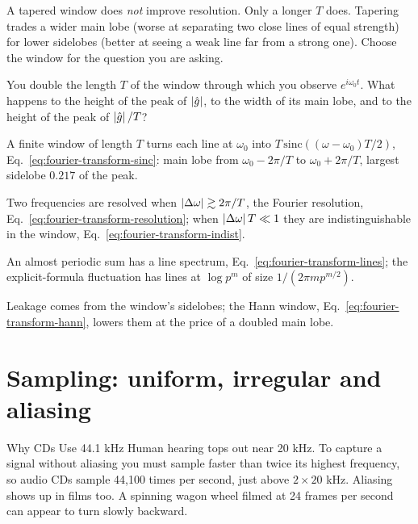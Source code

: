\begin{pitfall}
A tapered window does \emph{not} improve resolution. Only a longer $T$ does. Tapering trades a wider main lobe (worse at separating two close lines of equal strength) for lower sidelobes (better at seeing a weak line far from a strong one). Choose the window for the question you are asking.
\end{pitfall}

\begin{checkpoint}
You double the length $T$ of the window through which you observe $e^{i\omega_0t}$. What happens to the height of the peak of $\left\lvert \hat g\right\rvert$, to the width of its main lobe, and to the height of the peak of $\left\lvert \hat g\right\rvert/T$?
\end{checkpoint}

\begin{keyideas}

\item A finite window of length $T$ turns each line at $\omega_0$ into $T\,\mathrm{sinc}((\omega-\omega_0)T/2)$, Eq.~\eqref{eq:fourier-transform-sinc}: main lobe from $\omega_0-2\pi/T$ to $\omega_0+2\pi/T$, largest sidelobe $0.217$ of the peak.
\item Two frequencies are resolved when $\left\lvert \Delta\omega\right\rvert\gtrsim2\pi/T$, the Fourier resolution, Eq.~\eqref{eq:fourier-transform-resolution}; when $\left\lvert \Delta\omega\right\rvert T\ll1$ they are indistinguishable in the window, Eq.~\eqref{eq:fourier-transform-indist}.
\item An almost periodic sum has a line spectrum, Eq.~\eqref{eq:fourier-transform-lines}; the explicit-formula fluctuation has lines at $\log p^m$ of size $1/(2\pi mp^{m/2})$.
\item Leakage comes from the window's sidelobes; the Hann window, Eq.~\eqref{eq:fourier-transform-hann}, lowers them at the price of a doubled main lobe.

\end{keyideas}

\section{Sampling: uniform, irregular and aliasing}\label{sec:fourier-transform-sampling}
\begin{didyouknow}{Why CDs Use 44.1 kHz}
Human hearing tops out near 20 kHz. To capture a signal without aliasing you must sample faster than twice its highest frequency, so audio CDs sample 44{,}100 times per second, just above $2\times20$ kHz. Aliasing shows up in films too. A spinning wagon wheel filmed at 24 frames per second can appear to turn slowly backward.
\end{didyouknow}

